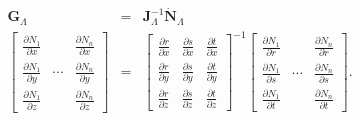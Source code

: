 \documentclass[]             %
{NASA}                       %
\begin{document}
\begin{eqnarray}
\mathbf{G}_{\Lambda} & = & \mathbf{J}_{\Lambda}^{-1}\dot{\mathbf{N}}_{\Lambda}\label{eq:shape-gradient-global}\\
\left[\begin{array}{ccc}
\frac{\partial N_{1}}{\partial x} &  & \frac{\partial N_{n}}{\partial x}\\
\frac{\partial N_{1}}{\partial y} & \cdots & \frac{\partial N_{n}}{\partial y}\\
\frac{\partial N_{1}}{\partial z} &  & \frac{\partial N_{n}}{\partial z}
\end{array}\right] & = & \left[\begin{array}{ccc}
\frac{\partial r}{\partial x} & \frac{\partial s}{\partial x} & \frac{\partial t}{\partial x}\\
\frac{\partial r}{\partial y} & \frac{\partial s}{\partial y} & \frac{\partial t}{\partial y}\\
\frac{\partial r}{\partial z} & \frac{\partial s}{\partial z} & \frac{\partial t}{\partial z}
\end{array}\right]^{-1}\left[\begin{array}{ccc}
\frac{\partial N_{1}}{\partial r} &  & \frac{\partial N_{n}}{\partial r}\\
\frac{\partial N_{1}}{\partial s} & \cdots & \frac{\partial N_{n}}{\partial s}\\
\frac{\partial N_{1}}{\partial t} &  & \frac{\partial N_{n}}{\partial t}
\end{array}\right]\text{.} \nonumber
\end{eqnarray}
\end{document}
